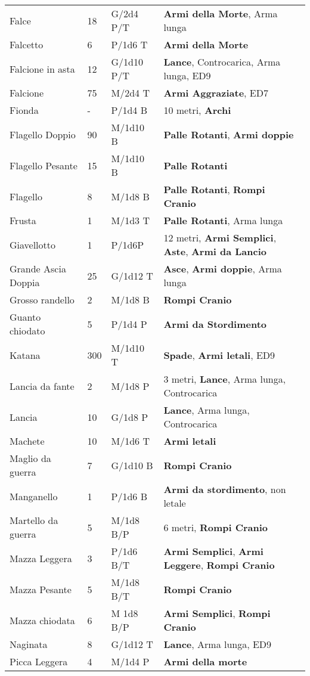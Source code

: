 \documentclass[a4paper,12 pt,openany]{book}
\begin{document}
\begin{textblock*}{19.5cm}
\begin{tabularx}{0.95\textwidth}{llll}
Falce& 18 & G/2d4 P/T& \textbf{Armi della Morte}, Arma lunga\\
Falcetto& 6& P/1d6 T& \textbf{Armi della Morte}\\
Falcione in asta& 12 & G/1d10 P/T& \textbf{Lance}, Controcarica, Arma lunga, ED9\\
Falcione& 75 & M/2d4 T& \textbf{Armi Aggraziate}, ED7\\
Fionda& -& P/1d4 B& 10 metri, \textbf{Archi}\\
Flagello Doppio& 90 & M/1d10 B& \textbf{Palle Rotanti}, \textbf{Armi doppie}\\
Flagello Pesante& 15 & M/1d10 B& \textbf{Palle Rotanti}\\
Flagello& 8& M/1d8 B& \textbf{Palle Rotanti}, \textbf{Rompi Cranio}\\
Frusta& 1& M/1d3 T& \textbf{Palle Rotanti}, Arma lunga\\
Giavellotto& 1& P/1d6P& 12 metri,  \textbf{Armi Semplici}, \textbf{Aste}, \textbf{Armi da Lancio}\\
Grande Ascia Doppia& 25 & G/1d12 T& \textbf{Asce}, \textbf{Armi doppie}, Arma lunga\\
Grosso randello& 2& M/1d8 B&\textbf{Rompi Cranio}\\
Guanto chiodato& 5& P/1d4 P&\textbf{Armi da Stordimento}\\
Katana& 300& M/1d10 T& \textbf{Spade}, \textbf{Armi letali}, ED9\\
Lancia da fante& 2& M/1d8 P&3 metri, \textbf{Lance}, Arma lunga, Controcarica\\
Lancia& 10 & G/1d8 P&\textbf{Lance}, Arma lunga, Controcarica\\
Machete& 10 & M/1d6 T&\textbf{Armi letali}\\
Maglio da guerra& 7& G/1d10 B& \textbf{Rompi Cranio}\\
Manganello& 1& P/1d6 B& \textbf{Armi da stordimento}, non letale\\
Martello da guerra& 5& M/1d8 B/P& 6 metri, \textbf{Rompi Cranio}\\
Mazza Leggera& 3& P/1d6 B/T& \textbf{Armi Semplici}, \textbf{Armi Leggere}, \textbf{Rompi Cranio} \\
Mazza Pesante& 5& M/1d8 B/T& \textbf{Rompi Cranio}\\
Mazza chiodata& 6& M 1d8 B/P& \textbf{Armi Semplici}, \textbf{Rompi Cranio}\\
Naginata& 8& G/1d12 T&\textbf{Lance}, Arma lunga, ED9\\
Picca Leggera& 4& M/1d4 P&\textbf{Armi della morte}\\

\end{tabularx}
\end{textblock*}
\end{document}
